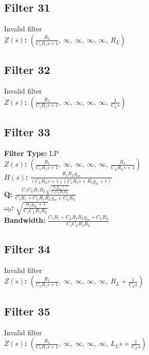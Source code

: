 \documentclass{article}
\begin{document}
\subsection*{Filter 31}
Invalid filter \\ 
\textbf{$Z(s)$:} $\left( \frac{R_{1}}{C_{1} R_{1} s + 1}, \  \infty, \  \infty, \  \infty, \  \infty, \  R_{L}\right)$ \\ 
\subsection*{Filter 32}
Invalid filter \\ 
\textbf{$Z(s)$:} $\left( \frac{R_{1}}{C_{1} R_{1} s + 1}, \  \infty, \  \infty, \  \infty, \  \infty, \  \frac{1}{C_{L} s}\right)$ \\ 
\subsection*{Filter 33}
\textbf{Filter Type:} LP \\ 
\textbf{$Z(s)$:} $\left( \frac{R_{1}}{C_{1} R_{1} s + 1}, \  \infty, \  \infty, \  \infty, \  \infty, \  \frac{R_{L}}{C_{L} R_{L} s + 1}\right)$ \\ 
\textbf{$H(s)$:} $\frac{R_{1} R_{L} g_{m}}{\left(C_{L} R_{L} s + 1\right) \left(C_{1} R_{1} s + R_{1} g_{m} + 1\right)}$ \\ 
\textbf{Q:} $\frac{C_{1} C_{L} R_{1} R_{L} \sqrt{\frac{R_{1} g_{m} + 1}{C_{1} C_{L} R_{1} R_{L}}}}{C_{1} R_{1} + C_{L} R_{1} R_{L} g_{m} + C_{L} R_{L}}$ \\ 
\textbf{$\omega_0$:} $\sqrt{\frac{R_{1} g_{m} + 1}{C_{1} C_{L} R_{1} R_{L}}}$ \\ 
\textbf{Bandwidth:} $\frac{C_{1} R_{1} + C_{L} R_{1} R_{L} g_{m} + C_{L} R_{L}}{C_{1} C_{L} R_{1} R_{L}}$ \\ 
\subsection*{Filter 34}
Invalid filter \\ 
\textbf{$Z(s)$:} $\left( \frac{R_{1}}{C_{1} R_{1} s + 1}, \  \infty, \  \infty, \  \infty, \  \infty, \  R_{L} + \frac{1}{C_{L} s}\right)$ \\ 
\subsection*{Filter 35}
Invalid filter \\ 
\textbf{$Z(s)$:} $\left( \frac{R_{1}}{C_{1} R_{1} s + 1}, \  \infty, \  \infty, \  \infty, \  \infty, \  L_{L} s + \frac{1}{C_{L} s}\right)$ \\ 
\end{document}
